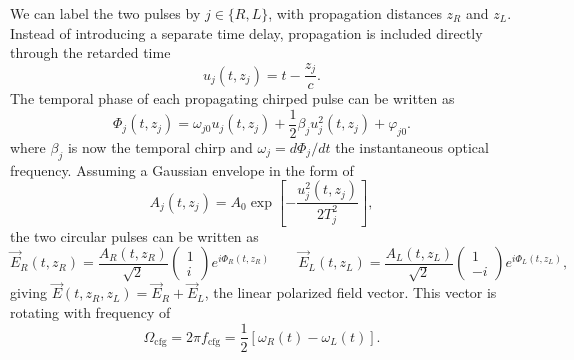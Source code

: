 We can label the two pulses by $j\in\{R,L\}$, with propagation distances $z_R$ and $z_L$. Instead of introducing a separate time delay, propagation is included directly through the retarded time
\begin{equation}
    u_j(t,z_j)=t-\frac{z_j}{c}.
    \label{eq:retarded_time}
\end{equation}
The temporal phase of each propagating chirped pulse can be written as
\begin{equation}
    \Phi_j(t,z_j) = \omega_{j0}u_j(t,z_j) + \frac{1}{2}\beta_j u_j^2(t,z_j) + \varphi_{j0}.
    \label{eq:time_phase}
\end{equation}
where $\beta_j$ is now the temporal chirp and $\omega_{j} = d\Phi_j/d t$ the instantaneous optical frequency. Assuming a Gaussian envelope in the form of
\begin{equation}
    A_j(t,z_j) = A_0 \exp\left[ -\frac{u_j^2(t,z_j)}{2T_j^2} \right],
    \label{eq:gaussian_envelope}
\end{equation}
the two circular pulses can be written as
\begin{equation}
    \vec E_R(t,z_R) = \frac{A_R(t,z_R)}{\sqrt{2}} \begin{pmatrix} 1\\ i \end{pmatrix} e^{i\Phi_R(t,z_R)} \qquad
    \vec E_L(t,z_L) = \frac{A_L(t,z_L)}{\sqrt{2}} \begin{pmatrix} 1\\ -i \end{pmatrix} e^{i\Phi_L(t,z_L)},
    \label{eq:circular_fields}
\end{equation}
giving $\vec E(t, z_R, z_L) = \vec E_R + \vec E_L$, the linear polarized field vector. This vector is rotating with frequency of
\begin{equation}
    \Omega_{\mathrm{cfg}}=2\pi f_{\mathrm{cfg}} = \frac{1}{2}[\omega_{R}(t) - \omega_{L}(t)].
    \label{eq:fcfg}
\end{equation}

